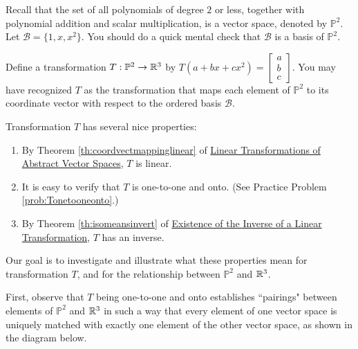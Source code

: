\documentclass{ximera}
\begin{document}
\begin{exploration}\label{init:isomorph}
Recall that the set of all polynomials of degree $2$ or less, together with polynomial addition and scalar multiplication, is a vector space, denoted by $\mathbb{P}^2$.  Let $\mathcal{B}=\{1, x, x^2\}$. You should do a quick mental check that $\mathcal{B}$ is a basis of $\mathbb{P}^2$.

Define a transformation $T:\mathbb{P}^2\rightarrow \mathbb{R}^3$ by
$T(a+bx+cx^2)=\begin{bmatrix}a\\b\\c\end{bmatrix}$.  You may have recognized $T$ as the transformation that maps each element of $\mathbb{P}^2$ to its coordinate vector with respect to the ordered basis $\mathcal{B}$.  

Transformation $T$ has several nice properties:
  \begin{enumerate}
      \item By Theorem \ref{th:coordvectmappinglinear} of \href{https://ximera.osu.edu/oerlinalg/LinearAlgebra/LTR-0022/main}{Linear Transformations of Abstract Vector Spaces}, $T$ is linear.
      \item It is easy to verify that $T$ is one-to-one and onto. (See Practice Problem \ref{prob:Tonetooneonto}.)
      \item By Theorem \ref{th:isomeansinvert} of \href{https://ximera.osu.edu/oerlinalg/LinearAlgebra/LTR-0035/main}{Existence of the Inverse of a Linear Transformation}, $T$ has an inverse.
  \end{enumerate}
  
  Our goal is to investigate and illustrate what these properties mean for transformation $T$, and for the relationship between $\mathbb{P}^2$ and $\mathbb{R}^3$.  
  
  First, observe that $T$ being one-to-one and onto establishes ``pairings" between elements of $\mathbb{P}^2$ and $\mathbb{R}^3$ in such a way that every element of one vector space is uniquely matched with exactly one element of the other vector space, as shown in the diagram below.
  
 \begin{center}
\end{center}
\end{exploration}
\end{document}

